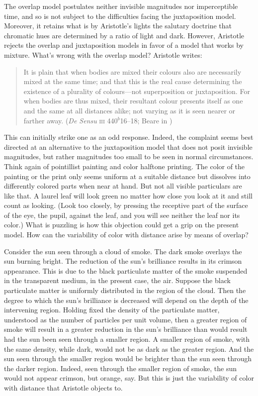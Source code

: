 The overlap model postulates neither invisible magnitudes nor imperceptible time, and so is not subject to the difficulties facing the juxtaposition model. Moreover, it retains what is by Aristotle's lights the salutary doctrine that chromatic hues are determined by a ratio of light and dark. However, Aristotle rejects the overlap and juxtaposition models in favor of a model that works by mixture. What's wrong with the overlap model? Aristotle writes:
\begin{quote}
	It is plain that when bodies are mixed their colours also are necessarily mixed at the same time; and that this is the real cause determining the existence of a plurality of colours—not superposition or juxtaposition. For when bodies are thus mixed, their resultant colour presents itself as one and the same at all distances alike; not varying as it is seen nearer or farther away. (\emph{De Sensu} \textsc{iii} 440\( ^{b} \)16--18; Beare in \citealt[10]{Barnes:1984uq})
\end{quote}
This can initially strike one as an odd response. Indeed, the complaint seems best directed at an alternative to the juxtaposition model that does not posit invisible magnitudes, but rather magnitudes too small to be seen in normal circumstances. Think again of pointillist painting and color halftone printing. The color of the painting or the print only seems uniform at a suitable distance but dissolves into differently colored parts when near at hand. But not all visible particulars are like that. A laurel leaf will look green no matter how close you look at it and still count as looking. (Look too closely, by pressing the receptive part of the surface of the eye, the pupil, against the leaf, and you will see neither the leaf nor its color.) What is puzzling is how this objection could get a grip on the present model. How can the variability of color with distance arise by means of overlap?

Consider the sun seen through a cloud of smoke. The dark smoke overlays the sun burning bright. The reduction of the sun's brilliance results in its crimson appearance. This is due to the black particulate matter of the smoke suspended in the transparent medium, in the present case, the air. Suppose the black particulate matter is uniformly distributed in the region of the cloud. Then the degree to which the sun's brilliance is decreased will depend on the depth of the intervening region. Holding fixed the density of the particulate matter, understood as the number of particles per unit volume, then a greater region of smoke will result in a greater reduction in the sun's brilliance than would result had the sun been seen through a smaller region. A smaller region of smoke, with the same density, while dark, would not be as dark as the greater region. And the sun seen through the smaller region would be brighter than the sun seen through the darker region. Indeed, seen through the smaller region of smoke, the sun would not appear crimson, but orange, say. But this is just the variability of color with distance that Aristotle objects to.

